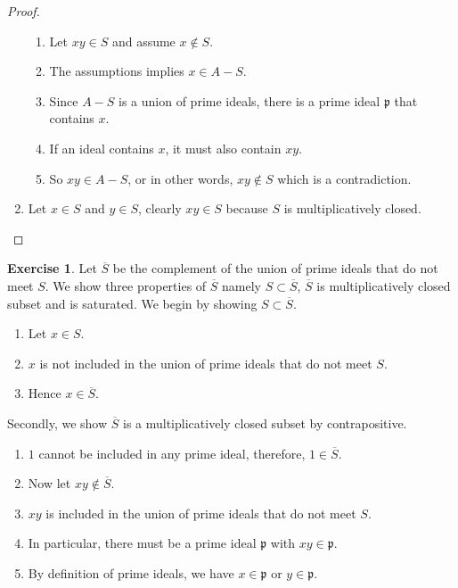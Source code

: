 \documentclass{book}
\theoremstyle{plain}
\theoremstyle{definition}
\newtheorem{exr}[thm]{Exercise}
\theoremstyle{custom_definition}
\begin{document}
\begin{proof}
\begin{enumerate}
        \begin{enumerate}
            \item Let \(xy \in S\) and assume \(x \not\in S\).
            \item The assumptions implies \(x \in A - S\).
            \item Since \(A - S\) is a union of prime ideals, there is a prime ideal \(\mathfrak{p}\) that contains \(x\).
            \item If an ideal contains \(x\), it must also contain \(xy\).
            \item So \(xy \in A - S\), or in other words, \(xy \not\in S\) which is a contradiction.
        \end{enumerate}
        \item Let \(x \in S\) and \(y \in S\), clearly \(xy \in S\) because \(S\) is multiplicatively closed.
    \end{enumerate}
\end{proof}

\begin{exr}
    Let \(\overline{S}\) be the complement of the union of prime ideals that do not meet \(S\). We show three properties of \(\overline{S}\) namely \(S \subset \overline{S}\), \(\overline{S}\) is multiplicatively closed subset and is saturated.
%
    We begin by showing \(S \subset \overline{S}\).
    \begin{enumerate}
        \item Let \(x \in S\).
        \item \(x\) is not included in the union of prime ideals that do not meet \(S\).
        \item Hence \(x \in \overline{S}\).
    \end{enumerate}
    Secondly, we show \(\overline{S}\) is a multiplicatively closed subset by contrapositive.
    \begin{enumerate}
        \item \(1\) cannot be included in any prime ideal, therefore, \(1 \in \overline{S}\).
        \item Now let \(xy \not\in \overline{S}\).
        \item \(xy\) is included in the union of prime ideals that do not meet \(S\).
        \item In particular, there must be a prime ideal \(\mathfrak{p}\) with \(xy \in \mathfrak{p}\).
        \item By definition of prime ideals, we have \(x \in \mathfrak{p}\) or \(y \in \mathfrak{p}\).
    \end{enumerate}
\end{exr}
\end{document}
